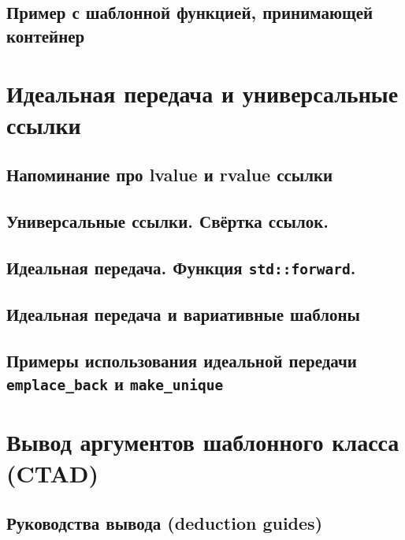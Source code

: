 \documentclass{article}
\begin{document}
\subsection*{Пример с шаблонной функцией, принимающей контейнер}



\section*{Идеальная передача и универсальные ссылки}
\subsection*{Напоминание про lvalue и rvalue ссылки}
\subsection*{Универсальные ссылки. Свёртка ссылок.}
\subsection*{Идеальная передача. Функция \texttt{std::forward}.}
\subsection*{Идеальная передача и вариативные шаблоны}
\subsection*{Примеры использования идеальной передачи \texttt{emplace\_back} и \texttt{make\_unique}}


\section*{Вывод аргументов шаблонного класса (CTAD)}
\subsection*{Руководства вывода (deduction guides)}
\end{document}
